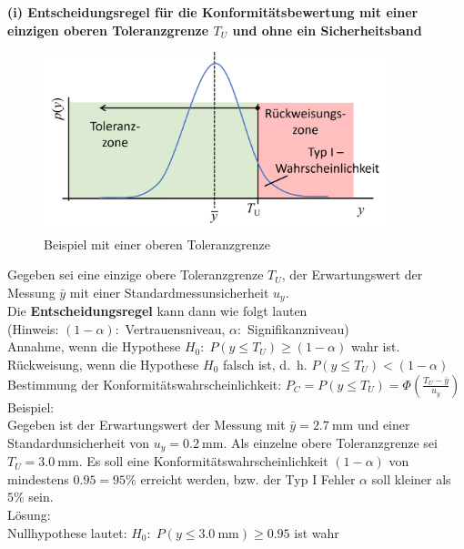 \textbf{(i) Entscheidungsregel für die Konformitätsbewertung mit einer einzigen oberen Toleranzgrenze $T_U$ und ohne ein Sicherheitsband} \\
\begin{figure}[!htb]	
	\begin{center}
		\includegraphics[width=100mm]{06_vorlesung/media/Einzelne_Obere_Toleranz.png}
		\caption{Beispiel mit einer oberen Toleranzgrenze}
		\label{fig:Beispiel_Toleranz_obere_Grenze}
	\end{center}
\end{figure}
Gegeben sei eine einzige obere Toleranzgrenze $T_U$, der Erwartungswert der Messung $\bar y$ mit einer Standardmessunsicherheit $u_y$. \\ 
Die \textbf{Entscheidungsregel} kann dann wie folgt lauten \\ (Hinweis: $(1-\alpha):$ Vertrauensniveau, $\alpha:$ Signifikanzniveau) \\
\hspace*{2em} Annahme, wenn die Hypothese 
$H_0: \; P(y \le T_U) \ge (1 - \alpha)$ wahr ist. \newline
\hspace*{2em} Rückweisung, wenn die Hypothese $H_0$ falsch ist, d.~h.  $P(y \le T_U) < (1 - \alpha)$ \newline
\hspace*{2em} Bestimmung der Konformitätswahrscheinlichkeit: $P_C = P(y \le T_U) =  
\Phi \left(\frac{T_U - \bar y}{u_y}\right) $ \newline
Beispiel:\\
Gegeben ist der Erwartungswert der Messung mit $\bar y=2.7~\mathrm{mm}$ und einer Standardunsicherheit von $u_y= 0.2~\mathrm{mm}$. Als einzelne obere Toleranzgrenze sei $T_U = 3.0~\mathrm{mm}$. Es soll eine Konformitätswahrscheinlichkeit $(1-\alpha)$ von mindestens $0.95 = 95\%$ erreicht werden, bzw. der Typ I Fehler $\alpha$ soll kleiner als $5\%$ sein. \\
Lösung: \\
Nullhypothese lautet: $ H_0: \; P(y\le 3.0~\mathrm{mm}) \ge 0.95$ ist wahr \\
